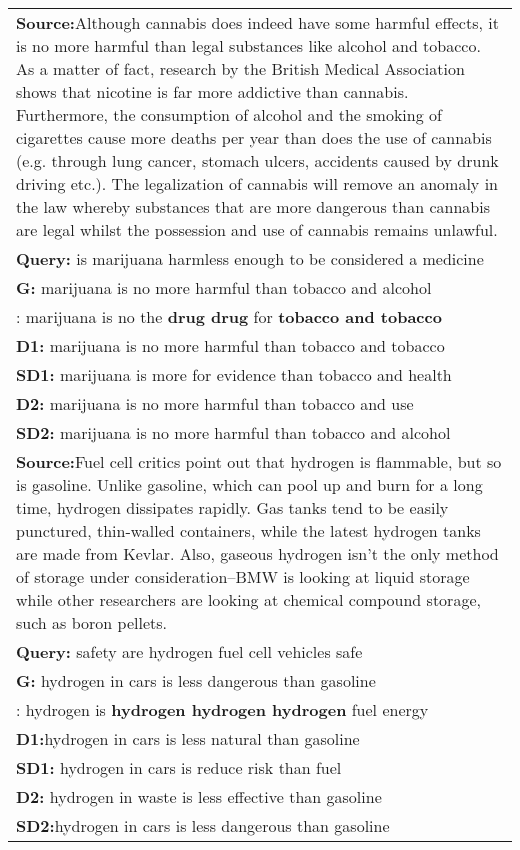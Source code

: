 \documentclass[11pt]{article}
\begin{document}
\begin{table*}[!tbh]
\begin{center}
\begin{tabular}{|p{}|}
\hline
\textbf{Source:}Although cannabis does indeed have some harmful effects, it is no more harmful than legal substances like alcohol and tobacco. As a matter of fact, research by the British Medical Association shows that nicotine is far more addictive than cannabis. Furthermore, the consumption of alcohol and the smoking of cigarettes cause more deaths per year than does the use of cannabis (e.g. through lung cancer, stomach ulcers, accidents caused by drunk driving etc.). The legalization of cannabis will remove an anomaly in the law whereby substances that are more dangerous than cannabis are legal whilst the possession and use of cannabis remains unlawful.\\
\textbf{Query:} is marijuana harmless enough to be considered a medicine\\
\textbf{G:} marijuana is no more harmful than tobacco and alcohol\\
\boldmath: marijuana is no the \textbf{drug drug} for \textbf{tobacco and tobacco}\\
\textbf{D1:} marijuana is no more harmful than tobacco and tobacco\\
\textbf{SD1:} marijuana is more for evidence than tobacco and health\\
\textbf{D2:} marijuana is no more harmful than tobacco and use \\
\textbf{SD2:} marijuana is no more harmful than tobacco and alcohol\\

\hline
\textbf{Source:}Fuel cell critics point out that hydrogen is flammable, but so is gasoline. Unlike gasoline, which can pool up and burn for a long time, hydrogen dissipates rapidly. Gas tanks tend to be easily punctured, thin-walled containers, while the latest hydrogen tanks are made from Kevlar. Also, gaseous hydrogen isn't the only method of storage under consideration--BMW is looking at liquid storage while other researchers are looking at chemical compound storage, such as boron pellets.\\
\textbf{Query:} safety are hydrogen fuel cell vehicles safe\\
\textbf{G:} hydrogen in cars is less dangerous than gasoline \\
\boldmath:  hydrogen is \textbf{hydrogen hydrogen hydrogen} fuel energy\\
\textbf{D1:}hydrogen in cars is less natural than gasoline\\
\textbf{SD1:} hydrogen in cars is reduce risk than fuel\\
\textbf{D2:} hydrogen in waste is less effective than gasoline\\
\textbf{SD2:}hydrogen in cars is less dangerous than gasoline \\


\end{tabular}
\end{center}
\end{table*}
\end{document}
